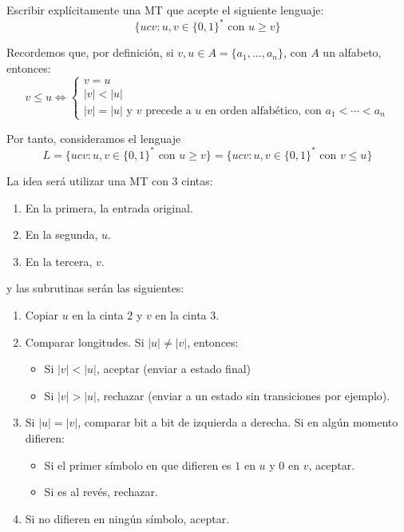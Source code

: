 \documentclass[12pt]{article}
\begin{document}
    \begin{ejercicio}
        Escribir explícitamente una MT que acepte el siguiente lenguaje:
        $$\{ucv : u,v \in \{0,1\}^* \text{ con } u \geq v\}$$ 

        Recordemos que, por definición, si $v, u \in A = \{a_1, \ldots, a_n\}$, 
        con $A$ un alfabeto, entonces:
        $$v \leq u \iff \begin{cases}
            v = u \\
            |v| < |u| \\
            |v| = |u| \text{ y $v$ precede a $u$ en orden alfabético,
            con $a_1 < \cdots < a_n$}
        \end{cases}$$

        Por tanto, consideramos el lenguaje 
        $$L = \{ucv : u,v \in \{0,1\}^* \text{ con } u \geq v\} = 
        \{ucv : u,v \in \{0,1\}^* \text{ con } v \leq u\}$$

        La idea será utilizar una MT con 3 cintas:
        \begin{enumerate}
            \item En la primera, la entrada original.
            \item En la segunda, $u$.
            \item En la tercera, $v$.
        \end{enumerate}
        y las subrutinas serán las siguientes:
        \begin{enumerate}
            \item Copiar $u$ en la cinta 2 y $v$ en la cinta 3.
            \item Comparar longitudes. Si $|u| \neq |v|$, entonces:
            \begin{itemize}
                \item Si $|v| < |u|$, aceptar (enviar a estado final)
                \item Si $|v| > |u|$, rechazar (enviar a un estado sin transiciones por ejemplo).
            \end{itemize}
            \item Si $|u| = |v|$, comparar bit a bit de izquierda a derecha.
            Si en algún momento difieren:
            \begin{itemize}
                \item Si el primer símbolo en que difieren es $1$ en $u$
                y $0$ en $v$, aceptar.
                \item Si es al revés, rechazar.
            \end{itemize}
            \item Si no difieren en ningún símbolo, aceptar.
        \end{enumerate}



\end{ejercicio}
\end{document}
